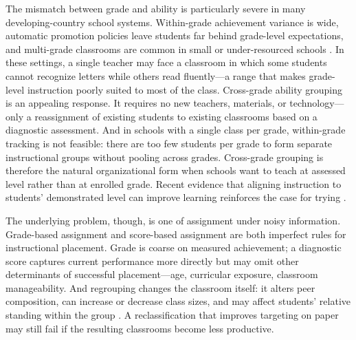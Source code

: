 \documentclass[11pt]{article}
\begin{document}
The mismatch between grade and ability is particularly severe in many developing-country school systems. Within-grade achievement variance is wide, automatic promotion policies leave students far behind grade-level expectations, and multi-grade classrooms are common in small or under-resourced schools \citep{banerjee/cole/duflo/linden:2007,muralidharan2019disrupting}. In these settings, a single teacher may face a classroom in which some students cannot recognize letters while others read fluently---a range that makes grade-level instruction poorly suited to most of the class. Cross-grade ability grouping is an appealing response. It requires no new teachers, materials, or technology---only a reassignment of existing students to existing classrooms based on a diagnostic assessment. And in schools with a single class per grade, within-grade tracking is not feasible: there are too few students per grade to form separate instructional groups without pooling across grades. Cross-grade grouping is therefore the natural organizational form when schools want to teach at assessed level rather than at enrolled grade. Recent evidence that aligning instruction to students' demonstrated level can improve learning reinforces the case for trying \citep{banerjee2017proof,duflo2020experimental}.

The underlying problem, though, is one of assignment under noisy information. Grade-based assignment and score-based assignment are both imperfect rules for instructional placement. Grade is coarse on measured achievement; a diagnostic score captures current performance more directly but may omit other determinants of successful placement---age, curricular exposure, classroom manageability. And regrouping changes the classroom itself: it alters peer composition, can increase or decrease class sizes, and may affect students' relative standing within the group \citep{betts:2011}. A reclassification that improves targeting on paper may still fail if the resulting classrooms become less productive.
\end{document}
